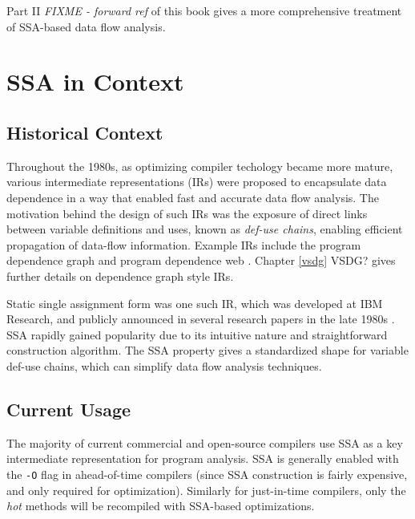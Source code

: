 Part II 
\emph{FIXME - forward ref}
of this book gives a more comprehensive treatment of 
SSA-based data flow analysis.



\section{SSA in Context}




\subsection{Historical Context}

Throughout the 1980s, as optimizing compiler
techology became more mature, various intermediate
representations (IRs) were proposed to encapsulate data
dependence in a way that enabled fast and accurate
data flow analysis.
The motivation behind the design of
such IRs was the exposure of direct links between variable
definitions and uses, known as \textit{def-use chains},
enabling efficient propagation of data-flow information.
Example IRs include the program dependence graph \cite{ferrante87program}
and program dependence web \cite{ottenstein90program}.
Chapter \ref{vsdg} VSDG? gives further details on dependence graph
style IRs.


Static single assignment form was one such IR, 
which was developed at IBM Research, and publicly announced
in several research papers in the late 1980s
\cite{rosen88global,alpern88detecting,cytron89efficient}.
SSA rapidly gained popularity due to its 
intuitive nature and straightforward
construction algorithm.
The SSA property gives a 
standardized shape for variable def-use chains,
which can simplify data flow analysis techniques.

\subsection{Current Usage}

The majority of current commercial and open-source compilers
use SSA as a key intermediate representation for
program analysis.
SSA is generally enabled with the \texttt{-O}
flag in ahead-of-time compilers (since SSA construction
is fairly expensive, and only required for optimization).
Similarly for just-in-time compilers, only the \textit{hot} 
methods will be recompiled with SSA-based optimizations.

